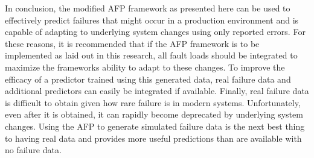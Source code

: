 In conclusion, the modified \ac{AFP} framework as presented here can be used to
effectively predict failures that might occur in a production environment and
is capable of adapting to underlying system changes using only reported errors.
For these reasons, it is recommended that if the \ac{AFP} framework is to be
implemented as laid out in this research, all fault loads should be integrated
to maximize the frameworks ability to adapt to these changes.  To improve the
efficacy of a predictor trained using this generated data, real failure data
and additional predictors can easily be integrated if available.  Finally, real
failure data is difficult to obtain given how rare failure is in modern
systems.  Unfortunately, even after it is obtained, it can rapidly become
deprecated by underlying system changes.  Using the \ac{AFP} to generate
simulated failure data is the next best thing to having real data and provides
more useful predictions than are available with no failure data.
